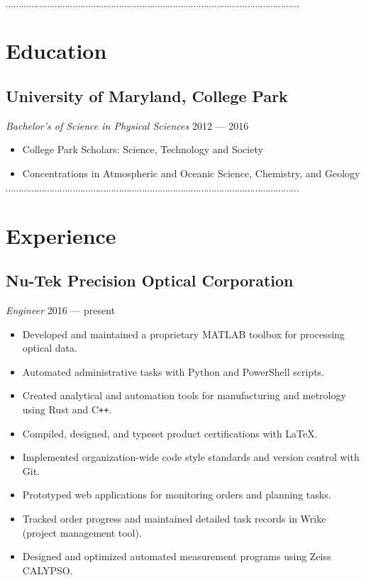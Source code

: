 \documentclass[10pt]{article}
\newcommand{\dotfringe}{
    \begin{center}
      $\cdots\cdots\cdots\cdots\cdots\cdots\cdots\cdots\cdots\cdots\cdots\cdots\cdots\cdots\cdots\cdots\cdots\cdots\cdots\cdots\cdots\cdots\cdots\cdots\cdots\cdots\cdots\cdots\cdots\cdots\cdots\cdots\cdots\cdots\cdots\cdots\cdots\cdots$
    \end{center}
}
\begin{document}

\dotfringe{}

\section*{Education}
\subsection*{University of Maryland, College Park}
\textit{Bachelor's of Science in Physical Sciences} \hfill 2012 --- 2016
\begin{itemize}
  \item College Park Scholars: Science, Technology and Society
  \item Concentrations in Atmospheric and Oceanic Science, Chemistry, and Geology
\end{itemize}

\dotfringe{}

\section*{Experience}
\subsection*{Nu-Tek Precision Optical Corporation}
\textit{Engineer} \hfill 2016 --- present
\begin{itemize}
  \item Developed and maintained a proprietary MATLAB toolbox for processing optical data.
  \item Automated administrative tasks with Python and PowerShell scripts.
  \item Created analytical and automation tools for manufacturing and metrology using Rust and C\texttt{++}.
  \item Compiled, designed, and typeset product  certifications with \LaTeX.
  \item Implemented organization-wide code style standards and version control with Git.
  \item Prototyped web applications for monitoring orders and planning tasks.
  \item Tracked order progress and maintained detailed task records in Wrike (project management tool).
  \item Designed and optimized automated measurement programs using Zeiss CALYPSO.\@
\end{itemize}
\end{document}
